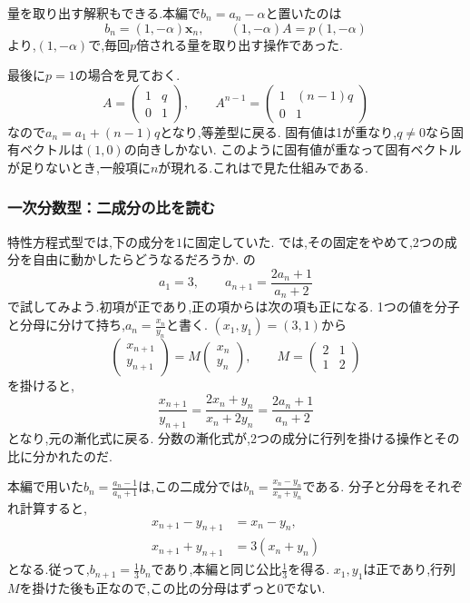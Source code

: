 量を取り出す解釈もできる.本編で$b_n=a_n-\alpha$と置いたのは
\[
  b_n=(1,-\alpha)\boldsymbol x_n,\qquad (1,-\alpha)A=p(1,-\alpha)
\]
より,$(1,-\alpha)$で,毎回$p$倍される量を取り出す操作であった.

最後に$p=1$の場合を見ておく.
\[
  A=\begin{pmatrix}1&q\\0&1\end{pmatrix},
  \qquad
  A^{n-1}=\begin{pmatrix}1&(n-1)q\\0&1\end{pmatrix}
\]
なので$a_n=a_1+(n-1)q$となり,等差型に戻る.
固有値は1が重なり,$q\ne0$なら固有ベクトルは$(1,0)$の向きしかない.
このように固有値が重なって固有ベクトルが足りないとき,一般項に$n$が現れる.これはで見た仕組みである.


\subsubsection{一次分数型：二成分の比を読む}\label{節：一次分数型：二成分の比を読む}

特性方程式型では,下の成分を$1$に固定していた.
では,その固定をやめて,2つの成分を自由に動かしたらどうなるだろうか.
の
\[
  a_1=3,\qquad a_{n+1}=\frac{2a_n+1}{a_n+2}
\]
で試してみよう.初項が正であり,正の項からは次の項も正になる.
1つの値を分子と分母に分けて持ち,$a_n=\frac{x_n}{y_n}$と書く.
$(x_1,y_1)=(3,1)$から
\[
  \begin{pmatrix}x_{n+1}\\y_{n+1}\end{pmatrix}
  =M\begin{pmatrix}x_n\\y_n\end{pmatrix},
  \qquad
  M=\begin{pmatrix}2&1\\1&2\end{pmatrix}
\]
を掛けると,
\[
  \frac{x_{n+1}}{y_{n+1}}
  =\frac{2x_n+y_n}{x_n+2y_n}
  =\frac{2a_n+1}{a_n+2}
\]
となり,元の漸化式に戻る.
分数の漸化式が,2つの成分に行列を掛ける操作とその比に分かれたのだ.

本編で用いた$b_n=\frac{a_n-1}{a_n+1}$は,この二成分では$b_n=\frac{x_n-y_n}{x_n+y_n}$である.
分子と分母をそれぞれ計算すると,
\[
  \begin{aligned}
    x_{n+1}-y_{n+1}&=x_n-y_n,\\
    x_{n+1}+y_{n+1}&=3(x_n+y_n)
  \end{aligned}
\]
となる.従って,$b_{n+1}=\frac13b_n$であり,本編と同じ公比$\frac13$を得る.
$x_1,y_1$は正であり,行列$M$を掛けた後も正なので,この比の分母はずっと0でない.

